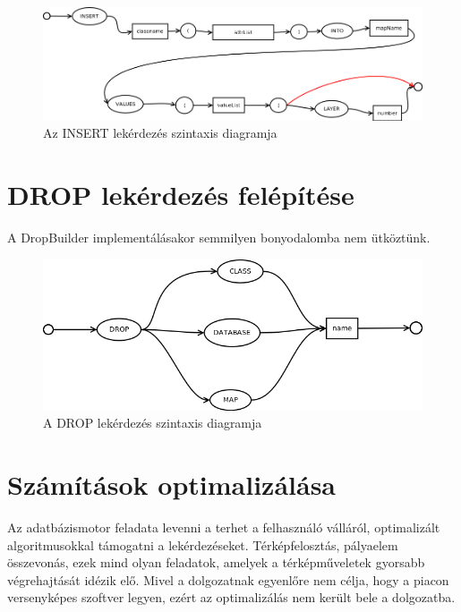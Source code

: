 \begin{figure}[htb]
	\begin{center}
		\includegraphics[scale=0.4]{images/insert}
		\caption{Az INSERT lekérdezés szintaxis diagramja}
		\label{fig:insertSytnax}
	\end{center}
\end{figure}


\section{DROP lekérdezés felépítése}

A DropBuilder implementálásakor semmilyen bonyodalomba nem ütköztünk.

\begin{figure}[htb]
	\begin{center}
		\includegraphics[scale=0.4]{images/drop}
		\caption{A DROP lekérdezés szintaxis diagramja}
		\label{fig:dropSytnax}
	\end{center}
\end{figure}

\section{Számítások optimalizálása}

Az adatbázismotor feladata levenni a terhet a felhasználó válláról, 
optimalizált algoritmusokkal támogatni a lekérdezéseket. Térképfelosztás, pályaelem összevonás, ezek mind olyan feladatok,
amelyek a térképműveletek gyorsabb végrehajtását idézik elő.
Mivel a dolgozatnak egyenlőre nem célja, hogy a piacon versenyképes szoftver legyen, ezért az optimalizálás nem került bele a dolgozatba.


